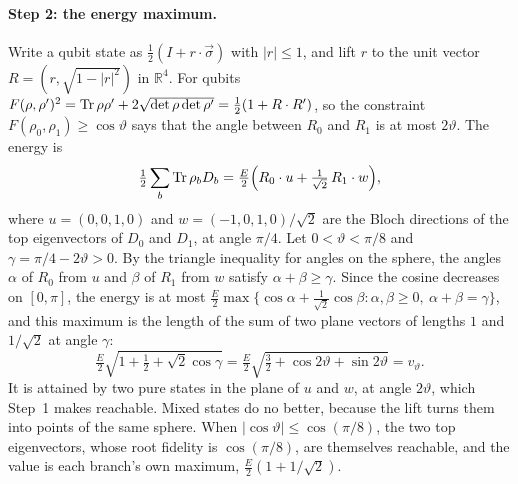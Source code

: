 \paragraph{Step 2: the energy maximum.} Write a qubit state as $\tfrac12(I+r\cdot\vec\sigma)$ with $|r|\le1$, and lift $r$ to the unit vector $R=(r,\sqrt{1-|r|^2})$ in $\mathbb R^4$. For qubits $F(\rho,\rho')^2=\operatorname{Tr}\rho\rho'+2\sqrt{\det\rho\det\rho'}=\tfrac12(1+R\cdot R')$, so the constraint $F(\rho_0,\rho_1)\ge\cos\vartheta$ says that the angle between $R_0$ and $R_1$ is at most $2\vartheta$. The energy is
\[
\tfrac12\sum_b\operatorname{Tr}\rho_bD_b=\tfrac E2\Bigl(R_0\cdot u+\tfrac1{\sqrt2}\,R_1\cdot w\Bigr),
\]
where $u=(0,0,1,0)$ and $w=(-1,0,1,0)/\sqrt2$ are the Bloch directions of the top eigenvectors of $D_0$ and $D_1$, at angle $\pi/4$. Let $0<\vartheta<\pi/8$ and $\gamma=\pi/4-2\vartheta>0$. By the triangle inequality for angles on the sphere, the angles $\alpha$ of $R_0$ from $u$ and $\beta$ of $R_1$ from $w$ satisfy $\alpha+\beta\ge\gamma$. Since the cosine decreases on $[0,\pi]$, the energy is at most $\tfrac E2\max\{\cos\alpha+\tfrac1{\sqrt2}\cos\beta:\alpha,\beta\ge0,\ \alpha+\beta=\gamma\}$, and this maximum is the length of the sum of two plane vectors of lengths $1$ and $1/\sqrt2$ at angle $\gamma$:
\[
\tfrac E2\sqrt{1+\tfrac12+\sqrt2\cos\gamma}=\tfrac E2\sqrt{\tfrac32+\cos2\vartheta+\sin2\vartheta}=v_\vartheta.
\]
It is attained by two pure states in the plane of $u$ and $w$, at angle $2\vartheta$, which Step~1 makes reachable. Mixed states do no better, because the lift turns them into points of the same sphere. When $|\cos\vartheta|\le\cos(\pi/8)$, the two top eigenvectors, whose root fidelity is $\cos(\pi/8)$, are themselves reachable, and the value is each branch's own maximum, $\tfrac E2(1+1/\sqrt2)$.


